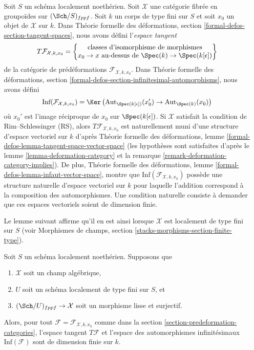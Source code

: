 \noindent
Soit $S$ un schéma localement noethérien. Soit $\mathcal{X}$ une catégorie
fibrée en groupoïdes sur $(\Sch/S)_{fppf}$. Soit $k$ un corps de type fini
sur $S$ et soit $x_0$ un objet de $\mathcal{X}$ sur $k$.
Dans Théorie formelle des déformations, section
\ref{formal-defos-section-tangent-spaces}, nous avons défini l'{\it espace
tangent}
\begin{equation}
\label{equation-tangent-space}
T\mathcal{F}_{\mathcal{X}, k, x_0} =
\left\{
\begin{matrix}
\text{classes d'isomorphisme de morphismes}\\
x_0 \to x\text{ au-dessus de }\Spec(k) \to \Spec(k[\epsilon])
\end{matrix}
\right\}
\end{equation}
de la catégorie de prédéformations $\mathcal{F}_{\mathcal{X}, k, x_0}$.
Dans Théorie formelle des déformations, section
\ref{formal-defos-section-infinitesimal-automorphisms}, nous avons défini
\begin{equation}
\label{equation-infinitesimal-automorphisms}
\text{Inf}(\mathcal{F}_{\mathcal{X}, k, x_0}) =
\Ker\left(
\text{Aut}_{\Spec(k[\epsilon])}(x'_0) \to \text{Aut}_{\Spec(k)}(x_0)
\right)
\end{equation}
où $x_0'$ est l'image réciproque de $x_0$ sur $\Spec(k[\epsilon])$.
Si $\mathcal{X}$ satisfait la condition de Rim--Schlessinger (RS), alors
$T\mathcal{F}_{\mathcal{X}, k, x_0}$ est naturellement muni d'une structure
d'espace vectoriel sur $k$ d'après Théorie formelle des déformations, lemme
\ref{formal-defos-lemma-tangent-space-vector-space}
(les hypothèses sont satisfaites d'après le lemme
\ref{lemma-deformation-category} et la remarque
\ref{remark-deformation-category-implies}). De plus, Théorie formelle des
déformations, lemme \ref{formal-defos-lemma-infaut-vector-space}, montre que
$\text{Inf}(\mathcal{F}_{\mathcal{X}, k, x_0})$ possède une structure
naturelle d'espace vectoriel sur $k$ pour laquelle l'addition correspond à la
composition des automorphismes. Une condition naturelle consiste à demander
que ces espaces vectoriels soient de dimension finie.

\medskip\noindent
Le lemme suivant affirme qu'il en est ainsi lorsque
$\mathcal{X}$ est localement de type fini sur $S$ (voir Morphismes de champs,
section \ref{stacks-morphisms-section-finite-type}).

\begin{lemma}
\label{lemma-finite-dimension}
Soit $S$ un schéma localement noethérien. Supposons que
\begin{enumerate}
\item $\mathcal{X}$ soit un champ algébrique,
\item $U$ soit un schéma localement de type fini sur $S$, et
\item $(\Sch/U)_{fppf} \to \mathcal{X}$ soit un morphisme lisse et
surjectif.
\end{enumerate}
Alors, pour tout $\mathcal{F} = \mathcal{F}_{\mathcal{X}, k, x_0}$ comme dans
la section \ref{section-predeformation-categories}, l'espace tangent
$T\mathcal{F}$ et l'espace des automorphismes infinitésimaux
$\text{Inf}(\mathcal{F})$ sont de dimension finie sur $k$.
\end{lemma}

